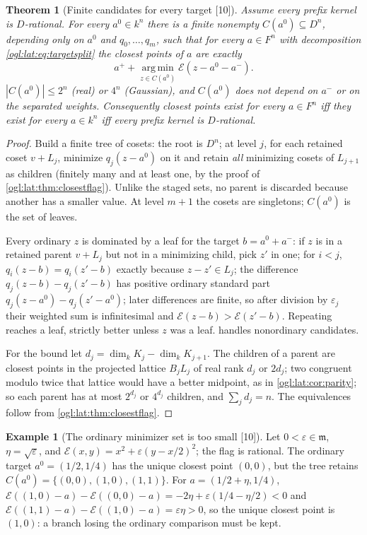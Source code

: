 \documentclass[11pt,oneside]{article}
\numberwithin{equation}{section}
\newtheorem{theorem}{Theorem}[section]
\theoremstyle{definition}
\newtheorem{example}[example]{Example}
\theoremstyle{remark}
\newcommand{\cE}{\mathcal E}
\newcommand{\mm}{\mathfrak m}
\newcommand{\argmin}{\operatorname*{arg\,min}}
\newcommand{\src}[1]{\textup{\textsf{\small[#1]}}}
\begin{document}
\begin{theorem}[Finite candidates for every target \src{10}]\label{ogl:lat:thm:alltargets}
Assume every prefix kernel is $D$-rational. For every $a^0\in k^n$ there is a
finite nonempty $C(a^0)\subseteq D^n$, depending only on $a^0$ and
$q_0,\dots,q_m$, such that for every $a\in F^n$ with decomposition
\eqref{ogl:lat:eq:targetsplit} the closest points of $a$ are exactly
\[
 a^++\argmin_{z\in C(a^0)}\cE(z-a^0-a^-).
\]
$|C(a^0)|\le2^n$ (real) or $4^n$ (Gaussian), and $C(a^0)$ does not depend on
$a^-$ or on the separated weights. Consequently closest points exist for every
$a\in F^n$ iff they exist for every $a\in k^n$ iff every prefix kernel is
$D$-rational.
\end{theorem}
\begin{proof}
Build a finite tree of cosets: the root is $D^n$; at level $j$, for each retained
coset $v+L_j$, minimize $q_j(z-a^0)$ on it and retain \emph{all} minimizing
cosets of $L_{j+1}$ as children (finitely many and at least one, by the proof of
\cref{ogl:lat:thm:closestflag}). Unlike the staged sets, no parent is discarded
because another has a smaller value. At level $m+1$ the cosets are singletons;
$C(a^0)$ is the set of leaves.

Every ordinary $z$ is dominated by a leaf for the target $b=a^0+a^-$: if $z$ is
in a retained parent $v+L_j$ but not in a minimizing child, pick $z'$ in one; for
$i<j$, $q_i(z-b)=q_i(z'-b)$ exactly because $z-z'\in L_j$; the difference
$q_j(z-b)-q_j(z'-b)$ has positive ordinary standard part
$q_j(z-a^0)-q_j(z'-a^0)$; later differences are finite, so after division by
$\varepsilon_j$ their weighted sum is infinitesimal and $\cE(z-b)>\cE(z'-b)$.
Repeating reaches a leaf, strictly better unless $z$ was a leaf.
 handles nonordinary candidates.

For the bound let $d_j=\dim_kK_j-\dim_kK_{j+1}$. The children of a parent are
closest points in the projected lattice $B_jL_j$ of real rank $d_j$ or $2d_j$;
two congruent modulo twice that lattice would have a better midpoint, as in
\cref{ogl:lat:cor:parity}; so each parent has at most $2^{d_j}$ or $4^{d_j}$
children, and $\sum_jd_j=n$. The equivalences follow from
\cref{ogl:lat:thm:closestflag}.
\end{proof}

\begin{example}[The ordinary minimizer set is too small \src{10}]\label{ogl:lat:ex:targetperturb}
Let $0<\varepsilon\in\mm$, $\eta=\sqrt\varepsilon$, and
$\cE(x,y)=x^2+\varepsilon(y-x/2)^2$; the flag is rational. The ordinary target
$a^0=(1/2,1/4)$ has the unique closest point $(0,0)$, but the tree retains
$C(a^0)=\{(0,0),(1,0),(1,1)\}$. For $a=(1/2+\eta,1/4)$,
$\cE((1,0)-a)-\cE((0,0)-a)=-2\eta+\varepsilon(1/4-\eta/2)<0$ and
$\cE((1,1)-a)-\cE((1,0)-a)=\varepsilon\eta>0$, so the unique closest point is
$(1,0)$: a branch losing the ordinary comparison must be kept.
\end{example}
\end{document}
